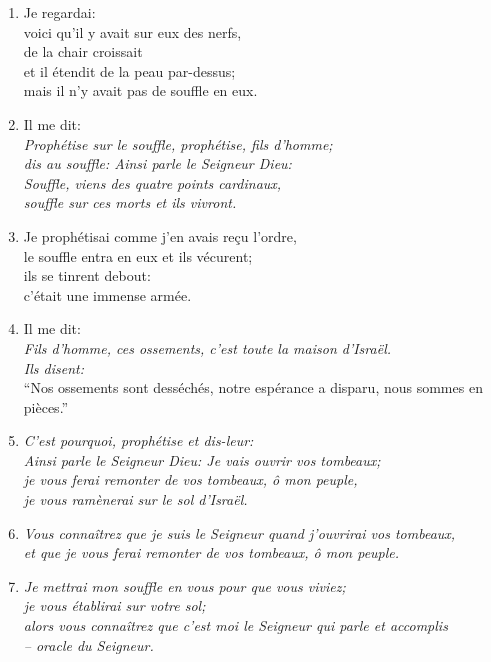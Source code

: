 \documentclass[12pt,a4paper,titlepage]{article}
\def \pslabelsep{0.2em} %
\def \psleftmargin{0em} %
\begin{document}
\begin{enumerate}[leftmargin=\psleftmargin, labelsep = \pslabelsep, label={\arabic*}, font=\color{\pscolor}\small\textsuperscript, parsep=0em, itemsep=0em, topsep=0em ]
\item Je regardai: \\ voici qu’il y avait sur eux des nerfs, \\ de la chair croissait \\ et il étendit de la peau par-dessus; \\ mais il n’y avait pas de souffle en eux.\verseSpace
\item Il me dit: \\ \decalage \og{}\emph{Prophétise sur le souffle, prophétise, fils d’homme; \\ \decalage dis au souffle: Ainsi parle le Seigneur Dieu: \\ \decalage Souffle, viens des quatre points cardinaux, \\ \decalage souffle sur ces morts et ils vivront.}\fg{}
\item Je prophétisai comme j’en avais reçu l’ordre, \\ le souffle entra en eux et ils vécurent; \\ ils se tinrent debout: \\ c’était une immense armée.\verseSpace
\item Il me dit: \\ \decalage \og{}\emph{Fils d’homme, ces ossements, c’est toute la maison d’Israël. \\ \decalage Ils disent:} \\ \decalage \decalage  “Nos ossements sont desséchés, notre espérance a disparu, nous sommes en pièces.”
\item \decalage \emph{C’est pourquoi, prophétise et dis-leur: \\ \decalage Ainsi parle le Seigneur Dieu: Je vais ouvrir vos tombeaux; \\ \decalage je vous ferai remonter de vos tombeaux, ô mon peuple, \\ \decalage je vous ramènerai sur le sol d’Israël.}
\item \decalage \emph{Vous connaîtrez que je suis le Seigneur quand j’ouvrirai vos tombeaux, \\ \decalage et que je vous ferai remonter de vos tombeaux, ô mon peuple.}
\item \decalage \emph{Je mettrai mon souffle en vous pour que vous viviez; \\ \decalage je vous établirai sur votre sol; \\ \decalage alors vous connaîtrez que c’est moi le Seigneur qui parle et accomplis \\ \decalage – oracle du Seigneur.}\fg{}\parSpace

\end{enumerate}
\end{document}
